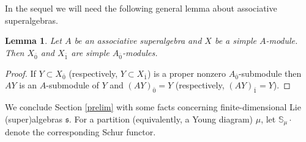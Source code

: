\documentclass[12pt]{amsart}
\makeatletter
\def\@putname#1#2#3#4{\def\@@ref{#3}\let\old@bf\bf
        \def\bf##1{\old@bf\if?\noexpand##1?{#4}\else##1\fi}%
	#1{#2}%
        \let\bf\old@bf}
\def\@putname#1#2#3#4{\def\@@ref{#3}\let\old@bf\bf	%
	\let\old@reset@font\reset@font			%
        \def\bf##1{\old@bf\if?\noexpand##1?{#4}\else##1\fi}%
	\def\reset@font##1##2{\old@reset@font##1\if?\noexpand##2?{#4}\else##2\fi}#1{#2}%
        \let\bf\old@bf\let\reset@font\old@reset@font}
\let\my@ref=\ref
\def\ref#1{\@putname\my@ref{#1}{#1}{\tiny\rm\@@ref}}
\theoremstyle{plain} %
\numberwithin{equation}{section}
\theoremstyle{definition}
\theoremstyle{remark}
\theoremstyle{plain} %
\newtheorem{lemma}[definition]{Lemma}
\makeatother
\begin{document}
  In the sequel we will need the following general lemma about associative superalgebras.

 \begin{lemma}\label{associative} Let $A$ be an associative superalgebra and $X$ be a simple $A$-module. Then $X_{\bar 0}$ and $X_{\bar 1}$ are simple
   $A_{\bar 0}$-modules.
 \end{lemma}
 \begin{proof} If $Y\subset X_{\bar 0}$ (respectively, $Y\subset X_{\bar 1}$) is a proper nonzero $A_{\bar 0}$-submodule then $AY$ is an $A$-submodule of $Y$
   and 
   $(AY)_{\bar 0}=Y$ (respectively, $(AY)_{\bar 1}=Y$).
   \end{proof}


 
We conclude  Section \ref{prelim} with some facts concerning finite-dimensional Lie (super)algebras $\mathfrak s$. For a partition (equivalently, a Young diagram) $\mu$, let $\mathbb S_{\mu} \cdot$ denote the corresponding Schur functor. 
\end{document}
